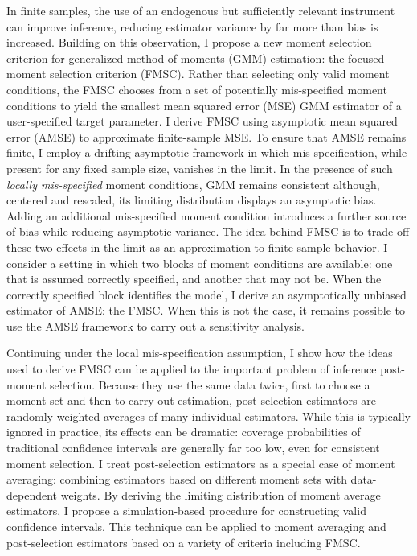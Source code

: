 \documentclass[12pt]{article}
\theoremstyle{definition}
\begin{document}
In finite samples, the use of an endogenous but sufficiently relevant instrument can improve inference, reducing estimator variance by far more than bias is increased. 
Building on this observation, I propose a new moment selection criterion for generalized method of moments (GMM) estimation: the focused moment selection criterion (FMSC). 
Rather than selecting only valid moment conditions, the FMSC chooses from a set of potentially mis-specified moment conditions to yield the smallest mean squared error (MSE) GMM estimator of a user-specified target parameter. 
I derive FMSC using asymptotic mean squared error (AMSE) to approximate finite-sample MSE. To ensure that AMSE remains finite, I employ a drifting asymptotic framework in which mis-specification, while present for any fixed sample size, vanishes in the limit. 
In the presence of such \emph{locally mis-specified} moment conditions, GMM remains consistent although, centered and rescaled, its limiting distribution displays an asymptotic bias. Adding an additional mis-specified moment condition introduces a further source of bias while reducing asymptotic variance. 
The idea behind FMSC is to trade off these two effects in the limit as an approximation to finite sample behavior. 
I consider a setting in which two blocks of moment conditions are available: one that is assumed correctly specified, and another that may not be.
When the correctly specified block identifies the model, I derive an asymptotically unbiased estimator of AMSE: the FMSC. When this is not the case, it remains possible to use the AMSE framework to carry out a sensitivity analysis. 

Continuing under the local mis-specification assumption, I show how the ideas used to derive FMSC can be applied to the important problem of inference post-moment selection. 
Because they use the same data twice, first to choose a moment set and then to carry out estimation, post-selection estimators are randomly weighted averages of many individual estimators.
While this is typically ignored in practice, its effects can be dramatic: coverage probabilities of traditional confidence intervals are generally far too low, even for consistent moment selection. 
I treat post-selection estimators as a special case of moment averaging: combining estimators based on different moment sets with data-dependent weights.
By deriving the limiting distribution of moment average estimators, I propose a simulation-based procedure for constructing valid confidence intervals. This technique can be applied to moment averaging and post-selection estimators based on a variety of criteria including FMSC. 
\end{document}
